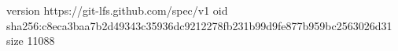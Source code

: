 version https://git-lfs.github.com/spec/v1
oid sha256:c8eca3baa7b2d49343c35936dc9212278fb231b99d9fe877b959bc2563026d31
size 11088
